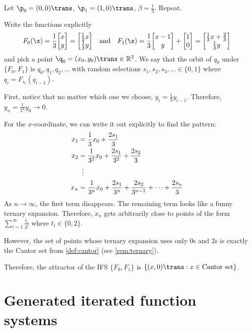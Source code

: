 \documentclass[class=pmath370,tikz,notes]{agony}
\begin{document}
\begin{example}
  Let $\p_0 = (0,0)\trans$, $\p_1 = (1,0)\trans$, $\beta = \frac13$.
  Repeat.
\end{example}
\begin{sol}
  Write the functions explicitly
  \[
    F_0(\x) = \frac13\mqty[x\\y] = \mqty[\frac13x\\\frac13y]
    \qq{and}
    F_1(\x) = \frac13\mqty[x-1\\y] + \mqty[1\\0] = \mqty[\frac13x + \frac23\\\frac13y]
  \]
  and pick a point $\q_0 = (x_0,y_0)\trans \in \R^2$.
  We say that the orbit of $q_0$ under $\{F_0,F_1\}$
  is $q_0,q_1,q_2,\dotsc$ with random selections $s_1,s_2,s_3,\dotsc \in \{0,1\}$
  where $q_i = F_{s_i}(q_{i-1})$.

  First, notice that no matter which one we choose, $y_i = \frac13y_{i-1}$.
  Therefore, $y_n = \frac{1}{3^n}y_0 \to 0$.

  For the $x$-coordinate, we can write it out explicitly to find the pattern:
  \begin{align*}
    x_1 & = \frac13x_0 + \frac{2s_1}{3}                                                          \\
    x_2 & = \frac{1}{3^2}x_0 + \frac{2s_1}{3^2} + \frac{2s_2}{3}                                 \\
        & \vdotswithin{=}                                                                        \\
    x_n & = \frac{1}{3^n}x_0 + \frac{2s_1}{3^n} + \frac{2s_2}{3^{n-1}} + \dotsb + \frac{2s_n}{3}
  \end{align*}
  As $n \to \infty$, the first term disappears.
  The remaining term looks like a funny ternary expansion.
  Therefore, $x_n$ gets arbitrarily close to points of the form
  $\sum_{i=1}^\infty \frac{t_i}{3^i}$ where $t_i \in \{0,2\}$.

  However, the set of points whose ternary expansion uses only 0s and 2s
  is exactly the Cantor set from \cref{def:cantor} (see \cref{rem:ternary}).

  Therefore, the attractor of the IFS $\{F_0,F_1\}$
  is $\{(x,0)\trans : x \in \text{Cantor set}\}$.
\end{sol}

\section{Generated iterated function systems}
\end{document}
